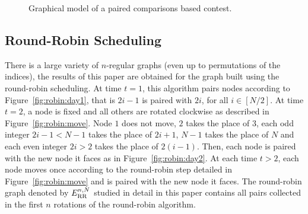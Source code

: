 \begin{figure}[h!]
\centering
{}
\caption{Graphical model of a paired comparisons based contest.}
\label{fig:generic:graphicalmodel}
\end{figure}

\subsection{Round-Robin Scheduling}\label{sec:RRscheduling}
There is a large variety of $n$-regular graphs (even up to permutations of the indices), the results of this paper are obtained for the graph built using the round-robin scheduling. At time $t=1$, this algorithm pairs nodes according to Figure~\ref{fig:robin:day1}, that is $2i-1$ is paired with $2i$, for all $i\in[N/2]$. At time $t=2$, a node is fixed and all others are rotated clockwise as described in Figure~\ref{fig:robin:move}. Node $1$ does not move, $2$ takes the place of $3$, each odd integer $2i-1<N-1$ takes the place of $2i+1$, $N-1$ takes the place of $N$ and each even integer $2i>2$ takes the place of $2(i-1)$. Then, each node is paired with the new node it faces as in Figure~\ref{fig:robin:day2}. At each time $t> 2$, each node moves once according to the round-robin step detailed in Figure~\ref{fig:robin:move} and is paired with the new node it faces. The round-robin graph denoted by $E^{n,N}_{{\rm RR}}$ studied in detail in this paper contains all pairs collected in the first $n$ rotations of the round-robin algorithm. 

